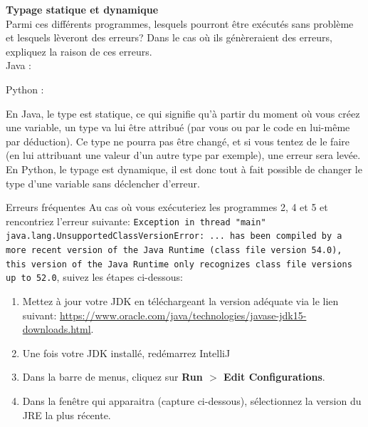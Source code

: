 \begin{Exercice}[5 minutes]  \textbf{Typage statique et dynamique}\\
    
    Parmi ces différents programmes, lesquels pourront être exécutés sans problème et lesquels lèveront des erreurs? Dans le cas où ils génèreraient des erreurs, expliquez la raison de ces erreurs.\\
    
    Java :
    
     
    
    Python :
    
     
    

    \begin{conseil}
    
        En Java, le type est statique, ce qui signifie qu'à partir du moment où vous créez une variable, un type va lui être attribué (par vous ou par le code en lui-même par déduction). Ce type ne pourra pas être changé, et si vous tentez de le faire (en lui attribuant une valeur d'un autre type par exemple), une erreur sera levée. \\

En Python, le typage est dynamique, il est donc tout à fait possible de changer le type d'une variable sans déclencher d'erreur. \\

    \end{conseil}

    \begin{Example}{\faExclamationTriangle \quad Erreurs fréquentes}
        Au cas où vous exécuteriez les programmes 2, 4 et 5 et rencontriez l'erreur suivante: \lstinline{Exception in thread "main" java.lang.UnsupportedClassVersionError: ... has been compiled by a more recent version of the Java Runtime (class file version 54.0), this version of the Java Runtime only recognizes class file versions up to 52.0}, suivez les étapes ci-dessous:
        \begin{enumerate}
            \item Mettez à jour votre JDK en téléchargeant la version adéquate via le lien suivant: \url{https://www.oracle.com/java/technologies/javase-jdk15-downloads.html}.
            \item Une fois votre JDK installé, redémarrez IntelliJ
            \item Dans la barre de menus, cliquez sur \textbf{Run $>$ Edit Configurations}.
            \item Dans la fenêtre qui apparaitra (capture ci-dessous), sélectionnez la version du JRE la plus récente.
        \end{enumerate}
        

\end{Example}
\end{Exercice}
